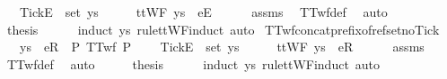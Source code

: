 \ \ \ {\isachardoublequoteopen}{\isacharbrackleft}Tick{\isacharbrackright}\isactrlsub E\ {\isasymnotin}\ set\ ys{\isachardoublequoteclose}\isanewline
%
\isadelimproof
%
\endisadelimproof
%
\isatagproof
{}\isamarkupfalse%
\ {\isacharminus}\isanewline
\ \ \isamarkupfalse%
\ {\isachardoublequoteopen}ttWF\ {\isacharparenleft}ys\ {\isacharat}\ {\isacharbrackleft}{\isacharbrackleft}e{}{\isacharbrackright}\isactrlsub E{\isacharbrackright}{\isacharparenright}{\isachardoublequoteclose}\isanewline
\ \ \ \ \isamarkupfalse%
\ assms\ \isamarkupfalse%
\ TTwf{\isacharunderscore}def\ \isamarkupfalse%
\ auto\isanewline
\ \ \isamarkupfalse%
\ \isamarkupfalse%
\ {\isacharquery}thesis\isanewline
\ \ \ \ \isamarkupfalse%
\ {\isacharparenleft}induct\ ys\ rule{\isacharcolon}ttWF{\isachardot}induct{\isacharcomma}\ auto{\isacharparenright}\isanewline
{}\isamarkupfalse%
%
\endisatagproof
{\isafoldproof}%
%
\isadelimproof
\isanewline
%
\endisadelimproof
\isanewline
{}\isamarkupfalse%
\ TTwf{\isacharunderscore}concat{\isacharunderscore}prefix{\isacharunderscore}of{\isacharunderscore}ref{\isacharunderscore}set{\isacharunderscore}no{\isacharunderscore}Tick{\isacharcolon}\isanewline
\ \ \ {\isachardoublequoteopen}ys\ {\isacharat}\ {\isacharbrackleft}{\isacharbrackleft}e{}{\isacharbrackright}\isactrlsub R{\isacharbrackright}\ {\isasymin}\ P{\isachardoublequoteclose}\ {\isachardoublequoteopen}TTwf\ P{\isachardoublequoteclose}\ \isanewline
\ \ \ {\isachardoublequoteopen}{\isacharbrackleft}Tick{\isacharbrackright}\isactrlsub E\ {\isasymnotin}\ set\ ys{\isachardoublequoteclose}\isanewline
%
\isadelimproof
%
\endisadelimproof
%
\isatagproof
{}\isamarkupfalse%
\ {\isacharminus}\isanewline
\ \ \isamarkupfalse%
\ {\isachardoublequoteopen}ttWF\ {\isacharparenleft}ys\ {\isacharat}\ {\isacharbrackleft}{\isacharbrackleft}e{}{\isacharbrackright}\isactrlsub R{\isacharbrackright}{\isacharparenright}{\isachardoublequoteclose}\isanewline
\ \ \ \ \isamarkupfalse%
\ assms\ \isamarkupfalse%
\ TTwf{\isacharunderscore}def\ \isamarkupfalse%
\ auto\isanewline
\ \ \isamarkupfalse%
\ \isamarkupfalse%
\ {\isacharquery}thesis\isanewline
\ \ \ \ \isamarkupfalse%
\ {\isacharparenleft}induct\ ys\ rule{\isacharcolon}ttWF{\isachardot}induct{\isacharcomma}\ auto{\isacharparenright}\isanewline
